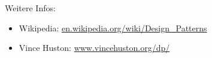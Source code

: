 Weitere Infos:
\begin{itemize}
\item Wikipedia: \href{http://en.wikipedia.org/wiki/Design_Patterns}
   {en.wikipedia.org/wiki/Design\_Patterns}
 \item Vince Huston: \href{http://www.vincehuston.org/dp}
   {www.vincehuston.org/dp/}
\end{itemize}
\newpage
